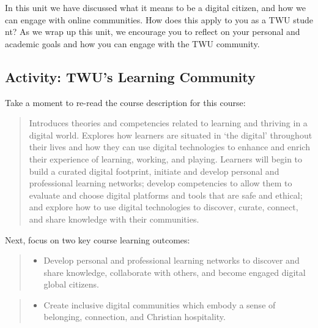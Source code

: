 \documentclass[
]{book}
\providecommand{\tightlist}{%
  \setlength{\itemsep}{0pt}\setlength{\parskip}{0pt}}
\theoremstyle{definition}
\theoremstyle{definition}
\theoremstyle{definition}
\theoremstyle{definition}
\theoremstyle{remark}
\begin{document}
In this unit we have discussed what it means to be a digital citizen, and how we can engage with online communities. How does this apply to you as a TWU stude
nt? As we wrap up this unit, we encourage you to reflect on your personal and academic goals and how you can engage with the TWU community.

\hypertarget{activity-twus-learning-community}{%
\subsection*{Activity: TWU's Learning Community}\label{activity-twus-learning-community}}

\begin{reflect}
Take a moment to re-read the course description for this course:

\begin{quote}
Introduces theories and competencies related to learning and thriving in a digital world. Explores how learners are situated in `the digital' throughout their lives and how they can use digital technologies to enhance and enrich their experience of learning, working, and playing. Learners will begin to build a curated digital footprint, initiate and develop personal and professional learning networks; develop competencies to allow them to evaluate and choose digital platforms and tools that are safe and ethical; and explore how to use digital technologies to discover, curate, connect, and share knowledge with their communities.
\end{quote}

Next, focus on two key course learning outcomes:

\begin{quote}
\begin{itemize}
\tightlist
\item
  Develop personal and professional learning networks to discover and share knowledge, collaborate with others, and become engaged digital global citizens.
\end{itemize}
\end{quote}

\begin{quote}
\begin{itemize}
\tightlist
\item
  Create inclusive digital communities which embody a sense of belonging, connection, and Christian hospitality.
\end{itemize}
\end{quote}


\end{reflect}
\end{document}
